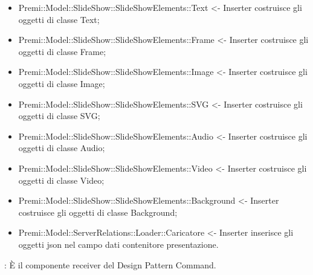 {{\begin{itemize}
            \item Premi::Model::SlideShow::SlideShowElements::Text <- Inserter costruisce gli oggetti di classe Text;
            \item Premi::Model::SlideShow::SlideShowElements::Frame <- Inserter costruisce gli oggetti di classe Frame;
            \item Premi::Model::SlideShow::SlideShowElements::Image <- Inserter costruisce gli oggetti di classe Image;
            \item Premi::Model::SlideShow::SlideShowElements::SVG <- Inserter costruisce gli oggetti di classe SVG;
            \item Premi::Model::SlideShow::SlideShowElements::Audio <- Inserter costruisce gli oggetti di classe Audio;
            \item Premi::Model::SlideShow::SlideShowElements::Video <- Inserter costruisce gli oggetti di classe Video;
            \item Premi::Model::SlideShow::SlideShowElements::Background <- Inserter costruisce gli oggetti di classe Background;
            \item Premi::Model::ServerRelations::Loader::Caricatore <- Inserter inserisce gli oggetti json nel campo dati contenitore presentazione.
		\end{itemize} 
		\textbf{\interfacce}: È il componente receiver del Design Pattern Command.\\
	}
	
}
